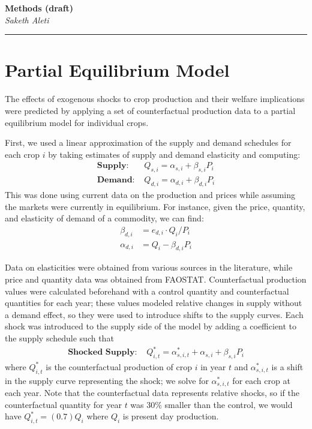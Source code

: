\documentclass[12pt]{article}
\begin{document}
\begin{center}
 	\large\textbf{Methods (draft)}\\
 	\small\textit{Saketh Aleti}
\end{center}
\rule{\textwidth}{1pt}

	
\section{Partial Equilibrium Model}	

The effects of exogenous shocks to crop production and their welfare implications were predicted by applying a set of counterfactual production data to a partial equilibrium model for individual crops. 

First, we used a linear approximation of the supply and demand schedules for each crop $i$ by taking estimates of supply and demand elasticity and computing:
\begin{subequations}
	\begin{align}
	\textbf{Supply: } & Q_{s, i} = \alpha_{s, i} + \beta_{s, i} P_i 				\\
	\textbf{Demand: } & Q_{d, i} = \alpha_{d, i} + \beta_{d, i} P_i 	
	\end{align}
\end{subequations}
This was done using current data on the production and prices while assuming the markets were currently in equilibrium. For instance, given the price, quantity, and elasticity of demand of a commodity, we can find:  
\begin{align*}
\beta_{d, i}  &= e_{d, i} \cdot Q_{i} / P_{i} \\
\alpha_{d, i} &= Q_{i} - \beta_{d, i} P_{i}
\end{align*}

Data on elasticities were obtained from various sources in the literature, while price and quantity data was obtained from FAOSTAT. Counterfactual production values were calculated beforehand with a control quantity and counterfactual quantities for each year; these values modeled relative changes in supply without a demand effect, so they were used to introduce shifts to the supply curves. 
Each shock was introduced to the supply side of the model by adding a coefficient to the supply schedule such that
\begin{subequations}
	\begin{align}
		\textbf{Shocked Supply: } & Q_{i, t}^* = \alpha_{s, i, t}^* + \alpha_{s, i} + \beta_{s, i} P_{i}
	\end{align}
\end{subequations}		
where $Q_{i, t}^*$ is the counterfactual production of crop $i$ in year $t$ and $\alpha_{s, i, t}^*$ is a shift in the supply curve representing the shock; we solve for $\alpha_{s, i, t}^*$ for each crop at each year. Note that the counterfactual data represents relative shocks, so if the counterfactual quantity for year $t$ was $30\%$ smaller than the control, we would have $Q_{i, t}^* = (0.7)Q_i$ where $Q_i$ is present day production. 
\end{document}
